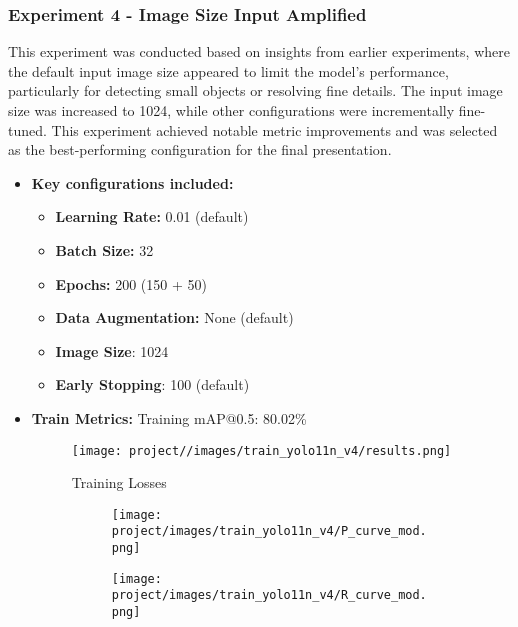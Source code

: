 \documentclass[11pt]{article}
\begin{document}
\subsubsection{Experiment 4 - Image Size Input Amplified} This experiment was conducted based on insights from earlier experiments, where the default input image size appeared to limit the model's performance, particularly for detecting small objects or resolving fine details. The input image size was increased to 1024, while other configurations were incrementally fine-tuned. This experiment achieved notable metric improvements and was selected as the best-performing configuration for the final presentation.

\begin{itemize}
    \item \textbf{Key configurations included:}   
    \begin{itemize} 
        \item \textbf{Learning Rate:} 0.01 (default) 
        \item \textbf{Batch Size:} 32 \item \textbf{Epochs:} 200 (150 + 50) 
        \item \textbf{Data Augmentation:} None (default)
        \item \textbf{Image Size}: 1024
        \item \textbf{Early Stopping}: 100 (default)
    \end{itemize}

    \item \textbf{Train Metrics:} Training mAP@0.5: 80.02\% 

        \begin{figure}[H]
            \centering
            \caption{Training Losses}
            \label{fig:enter-label}
            \texttt{[image: project//images/train\_yolo11n\_v4/results.png]} %
        \end{figure}

        \begin{figure}[H]
            \centering
            \caption{Comparison of Precision and Recall Confidence Curve}
            \label{fig:set1}
            \begin{subfigure}[b]{0.48\textwidth} %
                \centering
                \texttt{[image: project/images/train\_yolo11n\_v4/P\_curve\_mod.png]}
            \end{subfigure}
            \hspace{0.02\textwidth} %
            \begin{subfigure}[b]{0.48\textwidth} %
                \centering
                \texttt{[image: project/images/train\_yolo11n\_v4/R\_curve\_mod.png]}
            \end{subfigure}
        \end{figure}


\end{itemize}
\end{document}
